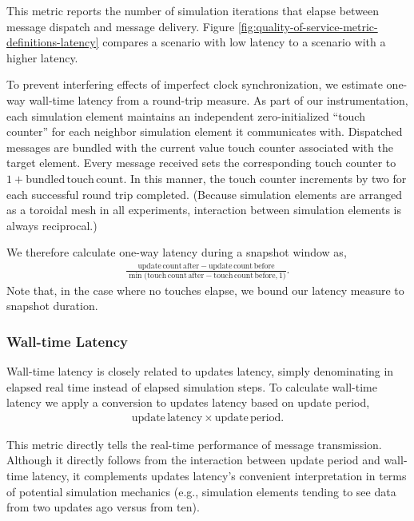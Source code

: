 This metric reports the number of simulation iterations that elapse between message dispatch and message delivery.
Figure \ref{fig:quality-of-service-metric-definitions-latency} compares a scenario with low latency to a scenario with a higher latency.

To prevent interfering effects of imperfect clock synchronization, we estimate one-way wall-time latency from a round-trip measure.
As part of our instrumentation, each simulation element maintains an independent zero-initialized ``touch counter'' for each neighbor simulation element it communicates with.
Dispatched messages are bundled with the current value touch counter associated with the target element.
Every message received sets the corresponding touch counter to $1 + \mathrm{bundled\,touch\,count}$.
In this manner, the touch counter increments by two for each successful round trip completed.
(Because simulation elements are arranged as a toroidal mesh in all experiments, interaction between simulation elements is always reciprocal.)

We therefore calculate one-way latency during a snapshot window as,
\begin{align*}
  \frac{
    \mathrm{update\,count\,after} - \mathrm{update\,count\,before}
  }{
    \min\Big( \mathrm{ touch\,count\,after } - \mathrm{ touch\,count\,before }, 1 \Big)
  }.
\end{align*}
Note that, in the case where no touches elapse, we bound our latency measure to snapshot duration.


\subsubsection{Wall-time Latency} \label{sec:simulation-time-latency-metric}

Wall-time latency is closely related to updates latency, simply denominating in elapsed real time instead of elapsed simulation steps.
To calculate wall-time latency we apply a conversion to updates latency based on update period,
\begin{align*}
  \mathrm{update\,latency} \times \mathrm{update\,period}.
\end{align*}

This metric directly tells the real-time performance of message transmission.
Although it directly follows from the interaction between update period and wall-time latency, it complements updates latency's convenient interpretation in terms of potential simulation mechanics (e.g., simulation elements tending to see data from two updates ago versus from ten).

